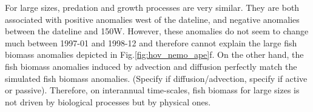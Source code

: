 For large sizes, predation and growth processes are very similar. They are both associated with positive anomalies west of the dateline, and negative anomalies between the dateline and 150W. However, these anomalies do not seem to change much between 1997-01 and 1998-12 and therefore cannot explain the large fish biomass anomalies depicted in Fig.\ref{fig:hov_nemo_ape}f. On the other hand, the fish biomass anomalies induced by advection and diffusion perfectly match the simulated fish biomass anomalies. \warn(Specify if diffusion/advection, specify if active or passive). Therefore, on interannual time-scales, fish biomass for large sizes is not driven by biological processes but by physical ones.


